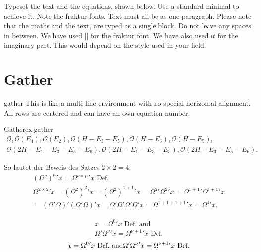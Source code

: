 {{{{\begin{casestudy}{%
Typeset the text and the equations, shown below. Use a standard minimal to achieve it. Note the fraktur fonts. Text must all be as one paragraph.}
Please note that the maths and the text, are typed as a single block. Do not leave any spaces in between. We have used |\mathfrak| for the fraktur font. We have also used $it$ for the imaginary part. This would depend on the style used in your field. 
\end{casestudy}

\clearpage
\section{Gather}

\begin{docEnvironment}{gather}{}
This is like a multi line environment with no special horizontal alignment. All rows
are centered and can have an own equation number:
\end{docEnvironment}

\begin{texexample}{Gather}{ex:gather}
\begingroup
\def\O{\mathcal{O}}
\begin{gather}
 \O,\O(E_4),\O(E_2),\O(H-E_3-E_5),\O(H-E_3),\O(H-E_5),\\ 
\O(2H-E_1-E_3-E_5-E_6),\O(2H-E_1-E_3-E_5),\O(2H-E_3-E_5-E_6).
\end{gather}

So lautet der Beweis des Satzes $2 \times 2 = 4$:
\begin{gather}
(\Omega^{\nu})^{\mu}{}'x = \Omega^{\nu \times \mu}{}'x \text{ Def.}\\
\Omega^{2 \times 2}{}'x = (\Omega^{2})^{2}{}'x = (\Omega^{2})^{1 + 1}{}'x = \Omega^{2}{}'\Omega^{2}{}'x = \Omega^{1 + 1}{}'\Omega^{1 + 1}{}'x\nonumber \\
= (\Omega'\Omega)'(\Omega'\Omega)'x = \Omega'\Omega'\Omega'\Omega'x = \Omega^{1 + 1 + 1 + 1}{}'x = \Omega^{4}{}'x.
\end{gather}


\begin{gather*}
  x = \Omega^{0}{}' x \text{ Def.\ and}\\
  \Omega'\Omega^{\nu}{}'x = \Omega^{\nu+1}{}'x \text{ Def.}
\end{gather*}
\begin{equation}
  x = \Omega^{0}{}' x \text{ Def.\ and}\\
\Omega'\Omega^{\nu}{}'x = \Omega^{\nu+1}{}'x \text{ Def.}
\end{equation}
\endgroup
\end{texexample}


}}}}
